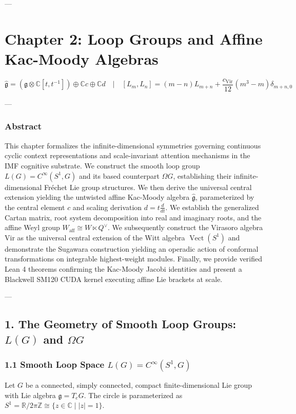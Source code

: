 \documentclass[11pt,twoside,openright]{amsbook}
\begin{document}
---

\chapter{Chapter 2: Loop Groups and Affine Kac-Moody Algebras}

$$\widehat{\mathfrak{g}} = \left(\mathfrak{g} \otimes \mathbb{C}[t, t^{-1}]\right) \oplus \mathbb{C} c \oplus \mathbb{C} d \quad \vert \quad [L_m, L_n] = (m - n) L_{m+n} + \frac{c_{\mathrm{Vir}}}{12}(m^3 - m)\delta_{m+n, 0}$$

---

\subsection{Abstract}
This chapter formalizes the infinite-dimensional symmetries governing continuous cyclic context representations and scale-invariant attention mechanisms in the IMF cognitive substrate. We construct the smooth loop group $L(G) = C^\infty(S^1, G)$ and its based counterpart $\Omega G$, establishing their infinite-dimensional Fréchet Lie group structures. We then derive the universal central extension yielding the untwisted affine Kac-Moody algebra $\widehat{\mathfrak{g}}$, parameterized by the central element $c$ and scaling derivation $d = t \frac{d}{dt}$. We establish the generalized Cartan matrix, root system decomposition into real and imaginary roots, and the affine Weyl group $W_{\mathrm{aff}} \cong W \ltimes Q^\vee$. We subsequently construct the Virasoro algebra $\mathrm{Vir}$ as the universal central extension of the Witt algebra $\operatorname{Vect}(S^1)$ and demonstrate the Sugawara construction yielding an operadic action of conformal transformations on integrable highest-weight modules. Finally, we provide verified Lean 4 theorems confirming the Kac-Moody Jacobi identities and present a Blackwell SM120 CUDA kernel executing affine Lie brackets at scale.

---

\section{1. The Geometry of Smooth Loop Groups: $L(G)$ and $\Omega G$}

\subsection{1.1 Smooth Loop Space $L(G) = C^\infty(S^1, G)$}
Let $G$ be a connected, simply connected, compact finite-dimensional Lie group with Lie algebra $\mathfrak{g} = T_e G$. The circle is parameterized as $S^1 = \mathbb{R} / 2\pi\mathbb{Z} \cong \{z \in \mathbb{C} \mid |z| = 1\}$.
\end{document}
